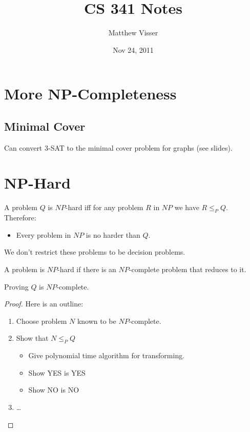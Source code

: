 \documentclass[12pt]{article}
\begin{document}
\title{CS 341 Notes}
\author{Matthew Visser}
\date{Nov 24, 2011}
\maketitle

\section{More NP-Completeness}

\subsection{Minimal Cover}

Can convert 3-SAT to the minimal cover problem for graphs (see slides).

\section{NP-Hard}

A problem $Q$ is $NP$-hard iff for any problem $R$ in $NP$ we have $R\le_P Q$.
Therefore:
\begin{itemize}
	\item Every problem in $NP$ is no harder than $Q$.
\end{itemize}

We don't restrict these problems to be decision problems.

A problem is $NP$-hard if there is an $NP$-complete problem that reduces to it.

Proving $Q$ is $NP$-complete.

\begin{proof}

	Here is an outline:
	\begin{enumerate}
		\item Choose problem $N$ known to be $NP$-complete.
		\item Show that $N\le_P Q$
			\begin{itemize}
				\item Give polynomial time algorithm for transforming.
				\item Show YES is YES
				\item Show NO is NO
			\end{itemize}
		\item \dots
	\end{enumerate}
\end{proof}
\end{document}
